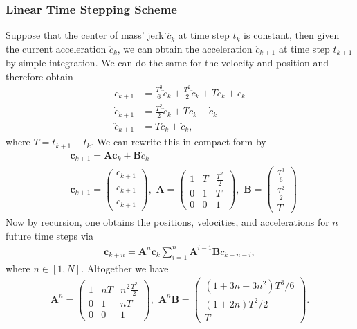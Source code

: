 \subsubsection{Linear Time Stepping Scheme}
Suppose that the center of mass' jerk $\dddot{c}_k$ at time step $t_k$ is constant, then given the current acceleration $\ddot{c}_k$, we can obtain the acceleration $\ddot{c}_{k+1}$ at time step $t_{k+1}$ by simple integration. We can do the same for the velocity and position and therefore obtain
\begin{align}
	c_{k+1} &= \frac{T^3}{6}\dddot{c}_k+\frac{T^2}{2}\ddot{c}_k+T\dot{c}_k+c_k\\
	\dot{c}_{k+1} &= \frac{T^2}{2}\dddot{c}_k+T\ddot{c}_k+\dot{c}_k\\
	\ddot{c}_{k+1} &= T\dddot{c}_{k} + \ddot{c}_k,
\end{align}
where $T = t_{k+1}-t_k$. We can rewrite this in compact form by
\begin{align}
	&\bm{c}_{k+1} = \bm{A}\bm{c}_k + \bm{B}\dddot{c}_k \\
	&\bm{c}_{k+1} = \begin{pmatrix}
	c_{k+1} \\
	\dot{c}_{k+1} \\
	\ddot{c}_{k+1}
	\end{pmatrix},\,\,
	\bm{A} = \begin{pmatrix}
	1 & T & \frac{T^2}{2} \\
	0 & 1 & T \\
	0 & 0 & 1
	\end{pmatrix},\,\,
	\bm{B} = \begin{pmatrix}
	\frac{T^3}{6} \\
	\frac{T^2}{2} \\
	T
	\end{pmatrix}
	\label{eq::312_ltss}
\end{align}
Now by recursion, one obtains the positions, velocities, and accelerations for $n$ future time steps via
\begin{align}
	\bm{c}_{k+n} = \bm{A}^n\bm{c}_k\sum_{i=1}^n \bm{A}^{i-1}\bm{B}\dddot{c}_{k+n-i},
\end{align}
where $n\in[1,N]$. Altogether we have
\begin{align}
	\bm{A}^n = \begin{pmatrix}
	1 & nT & n^2\frac{T^2}{2} \\
	0 & 1 & nT \\
	0 & 0 & 1
	\end{pmatrix},\,\,
	\bm{A}^n\bm{B} = \begin{pmatrix}
	(1+3n+3n^2)T^3/6 \\
	(1+2n)T^2/2 \\
	T
	\end{pmatrix}.
\end{align}

